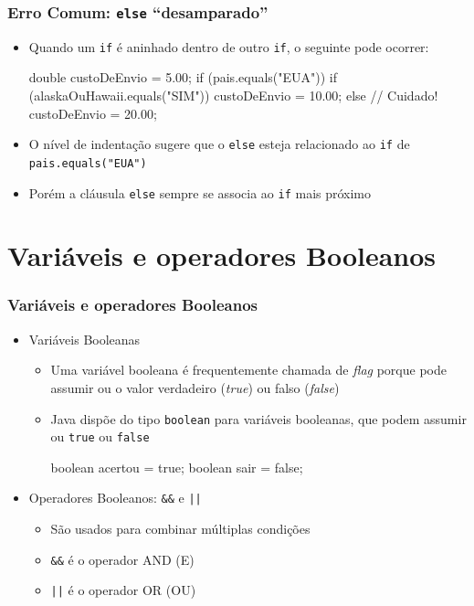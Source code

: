 \documentclass[xcolor={dvipsnames,table},aspectratio=169]{beamer}
\begin{document}
\begin{frame}[fragile]\frametitle{Erro Comum: \texttt{else} ``desamparado''}
\begin{itemize}
	\item Quando um \texttt{if} é aninhado dentro de outro \texttt{if}, o seguinte pode ocorrer:
\begin{javacode}
double custoDeEnvio = 5.00;
if (pais.equals("EUA"))
   if (alaskaOuHawaii.equals("SIM"))
      custoDeEnvio = 10.00;
else // Cuidado!
   custoDeEnvio = 20.00;
\end{javacode}
	\item O nível de indentação sugere que o \texttt{else} esteja relacionado ao \texttt{if} de \texttt{pais.equals("EUA")}
	\item Porém a cláusula \texttt{else} sempre se associa ao \texttt{if} mais próximo
\end{itemize}
\end{frame}

\section{Variáveis e operadores Booleanos}

\begin{frame}[fragile]\frametitle{Variáveis e operadores Booleanos}
\begin{itemize}
	\item Variáveis Booleanas
	\begin{itemize}
		\item Uma variável booleana é frequentemente chamada de \emph{flag} porque pode assumir ou o valor verdadeiro (\emph{true}) ou falso (\emph{false})
		\item Java dispõe do tipo \texttt{boolean} para variáveis booleanas, que podem assumir ou \texttt{true} ou \texttt{false}
\begin{javacode}
boolean acertou = true;
boolean sair = false;
\end{javacode}
	\end{itemize}
	\item Operadores Booleanos: \texttt{\&\&} e \texttt{||}
	\begin{itemize}
		\item São usados para combinar múltiplas condições
		\item \texttt{\&\&} é o operador AND (E)
		\item \texttt{||} é o operador OR (OU)
	\end{itemize}
\end{itemize}
\end{frame}
\end{document}

